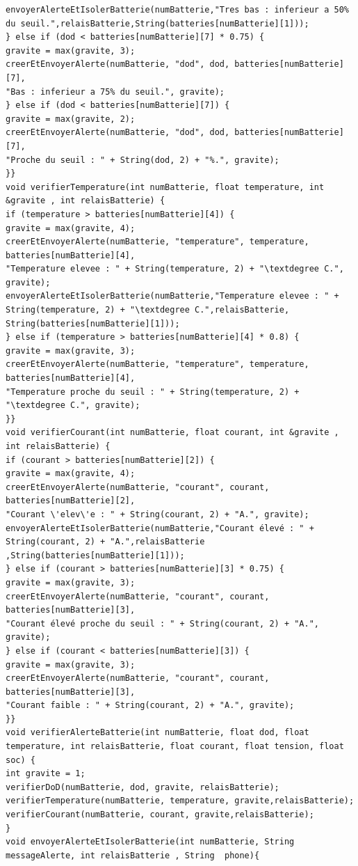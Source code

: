 \begin{lstlisting}[caption=Code de monitoring des batteries]
envoyerAlerteEtIsolerBatterie(numBatterie,"Tres bas : inferieur a 50% du seuil.",relaisBatterie,String(batteries[numBatterie][1]));
} else if (dod < batteries[numBatterie][7] * 0.75) {
gravite = max(gravite, 3);
creerEtEnvoyerAlerte(numBatterie, "dod", dod, batteries[numBatterie][7],
"Bas : inferieur a 75% du seuil.", gravite);
} else if (dod < batteries[numBatterie][7]) {
gravite = max(gravite, 2);
creerEtEnvoyerAlerte(numBatterie, "dod", dod, batteries[numBatterie][7],
"Proche du seuil : " + String(dod, 2) + "%.", gravite);
}}
void verifierTemperature(int numBatterie, float temperature, int &gravite , int relaisBatterie) {
if (temperature > batteries[numBatterie][4]) {
gravite = max(gravite, 4);
creerEtEnvoyerAlerte(numBatterie, "temperature", temperature, batteries[numBatterie][4],
"Temperature elevee : " + String(temperature, 2) + "\textdegree C.", gravite);
envoyerAlerteEtIsolerBatterie(numBatterie,"Temperature elevee : " + String(temperature, 2) + "\textdegree C.",relaisBatterie, String(batteries[numBatterie][1]));
} else if (temperature > batteries[numBatterie][4] * 0.8) {
gravite = max(gravite, 3);
creerEtEnvoyerAlerte(numBatterie, "temperature", temperature, batteries[numBatterie][4],
"Temperature proche du seuil : " + String(temperature, 2) + "\textdegree C.", gravite);
}}
void verifierCourant(int numBatterie, float courant, int &gravite , int relaisBatterie) {
if (courant > batteries[numBatterie][2]) {
gravite = max(gravite, 4);
creerEtEnvoyerAlerte(numBatterie, "courant", courant, batteries[numBatterie][2],
"Courant \'elev\'e : " + String(courant, 2) + "A.", gravite);
envoyerAlerteEtIsolerBatterie(numBatterie,"Courant élevé : " + String(courant, 2) + "A.",relaisBatterie ,String(batteries[numBatterie][1]));
} else if (courant > batteries[numBatterie][3] * 0.75) {
gravite = max(gravite, 3);
creerEtEnvoyerAlerte(numBatterie, "courant", courant, batteries[numBatterie][3],
"Courant élevé proche du seuil : " + String(courant, 2) + "A.", gravite);
} else if (courant < batteries[numBatterie][3]) {
gravite = max(gravite, 3);
creerEtEnvoyerAlerte(numBatterie, "courant", courant, batteries[numBatterie][3],
"Courant faible : " + String(courant, 2) + "A.", gravite);
}}
void verifierAlerteBatterie(int numBatterie, float dod, float temperature, int relaisBatterie, float courant, float tension, float soc) {
int gravite = 1; 
verifierDoD(numBatterie, dod, gravite, relaisBatterie);
verifierTemperature(numBatterie, temperature, gravite,relaisBatterie);
verifierCourant(numBatterie, courant, gravite,relaisBatterie);
}
void envoyerAlerteEtIsolerBatterie(int numBatterie, String messageAlerte, int relaisBatterie , String  phone){

\end{lstlisting}
